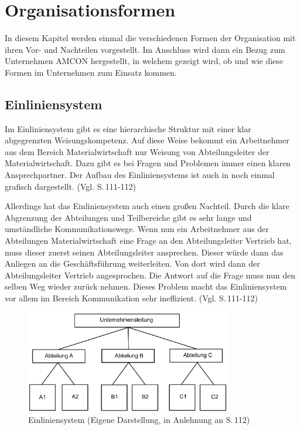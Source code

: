 \section{Organisationsformen} \label{Organisationsformen}
    In diesem Kapitel werden einmal die verschiedenen Formen der Organisation mit ihren Vor- und Nachteilen vorgestellt.
    Im Anschluss wird dann ein Bezug zum Unternehmen AMCON hergestellt, in welchem gezeigt wird, ob und wie diese Formen
    im Unternehmen zum Einsatz kommen.

    \subsection{Einliniensystem} \label{Einliniensystem}
        Im Einliniensystem gibt es eine hierarchische Struktur mit einer klar abgegrenzten Weisungskompetenz. Auf diese 
        Weise bekommt ein Arbeitnehmer aus dem Bereich Materialwirtschaft nur Weisung von Abteilungsleiter der 
        Materialwirtschaft. Dazu gibt es bei Fragen und Problemen immer einen klaren Ansprechpartner. Der Aufbau des 
        Einliniensystems ist auch in  noch einmal grafisch dargestellt.
        (Vgl. \cite{Woehe2020} S.\,111-112)

        Allerdings hat das Einliniensystem auch einen großen Nachteil. Durch die klare Abgrenzung der Abteilungen und 
        Teilbereiche gibt es sehr lange und umständliche Kommunikationswege. Wenn nun ein Arbeitnehmer aus der 
        Abteilungen Materialwirtschaft eine Frage an den Abteilungsleiter Vertrieb hat, muss dieser zuerst seinen 
        Abteilungsleiter ansprechen. Dieser würde dann das Anliegen an die Geschäftsführung weiterleiten. Von dort wird 
        dann der Abteilungsleiter Vertrieb angesprochen. Die Antwort auf die Frage muss nun den selben Weg wieder zurück
        nehmen. Dieses Problem macht das Einliniensystem vor allem im Bereich Kommunikation sehr ineffizient. 
        (Vgl. \cite{Woehe2020} S.\,111-112)

        \begin{figure}[ht]
            \centering
            \includegraphics[width = 0.8\textwidth]{Eigene Darstellungen/Einliniensystem.PNG}

            \caption{Einliniensystem (Eigene Darstellung, in Anlehnung an \cite{Woehe2020} S.\,112)} \label{Einlinie}
        \end{figure}
    

